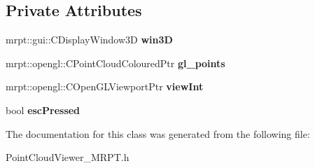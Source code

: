 \subsection*{Private Attributes}
\begin{DoxyCompactItemize}
\item 
\hypertarget{class_point_cloud_viewer___m_r_p_t_a63ec254507d94ddbf015f971f9eb3394}{
mrpt::gui::CDisplayWindow3D {\bfseries win3D}}
\label{class_point_cloud_viewer___m_r_p_t_a63ec254507d94ddbf015f971f9eb3394}

\item 
\hypertarget{class_point_cloud_viewer___m_r_p_t_a283adbfa64f409aaa12e0722e94accc4}{
mrpt::opengl::CPointCloudColouredPtr {\bfseries gl\_\-points}}
\label{class_point_cloud_viewer___m_r_p_t_a283adbfa64f409aaa12e0722e94accc4}

\item 
\hypertarget{class_point_cloud_viewer___m_r_p_t_a8a6762489cce8534892b073aa957a371}{
mrpt::opengl::COpenGLViewportPtr {\bfseries viewInt}}
\label{class_point_cloud_viewer___m_r_p_t_a8a6762489cce8534892b073aa957a371}

\item 
\hypertarget{class_point_cloud_viewer___m_r_p_t_a34c427f74ea251956fa06735add96034}{
bool {\bfseries escPressed}}
\label{class_point_cloud_viewer___m_r_p_t_a34c427f74ea251956fa06735add96034}

\end{DoxyCompactItemize}


The documentation for this class was generated from the following file:\begin{DoxyCompactItemize}
\item 
PointCloudViewer\_\-MRPT.h\end{DoxyCompactItemize}
